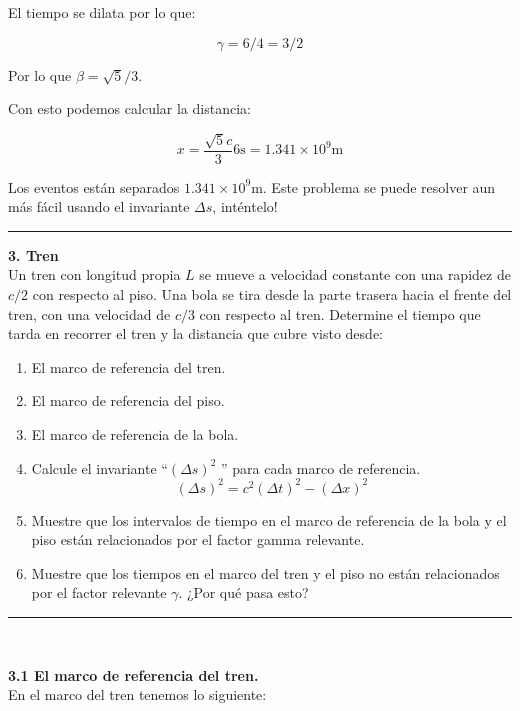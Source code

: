 \documentclass[12pt]{article}
\begin{document}
El tiempo se dilata por lo que:

\begin{equation}
\gamma = 6/4 = 3/2
\end{equation}

Por lo que $\beta  = \sqrt{5}/3$. 

Con esto podemos calcular la distancia:

\begin{equation}
x = \frac{\sqrt{5}c }{3} 6\text{s} = 1.341 \times 10^9 \text{m}  
\end{equation}

Los eventos están separados $ 1.341 \times 10^9 \text{m}$. Este problema se puede resolver aun más fácil usando el invariante $\Delta s$, inténtelo!
\color{ForestGreen}

\noindent\rule{16.5cm}{0.4pt}


\textbf{3. Tren}\\

 Un tren con longitud propia $L$  se mueve a velocidad constante con una rapidez de $c/2$ con
 respecto al piso. Una bola se tira desde la parte trasera hacia el frente del tren, con una velocidad de $c/3$ con respecto al tren. Determine el tiempo que tarda en recorrer el tren y la distancia que cubre visto desde:

 \begin{enumerate}
	\item  El marco de referencia del tren.
	\item  El marco de referencia del piso.
	\item  El marco de referencia de la bola.
	\item  Calcule el invariante “$(\Delta s)^2$ ” para cada marco de referencia. 
	$$(\Delta s)^2 = c^2(\Delta t)^2 - (\Delta x)^2$$
	\item  Muestre que los intervalos de tiempo en el marco de referencia de la bola y el piso están relacionados por el factor gamma relevante.
	\item  Muestre que los tiempos en el marco del tren y el piso no están relacionados por el factor relevante $\gamma$. ¿Por qué pasa esto?
\end{enumerate} 
\noindent\rule{16.5cm}{0.4pt}\\

\color{Black}

\textbf{3.1 El marco de referencia del tren.}\\


 En el marco del tren tenemos lo siguiente:
\end{document}
